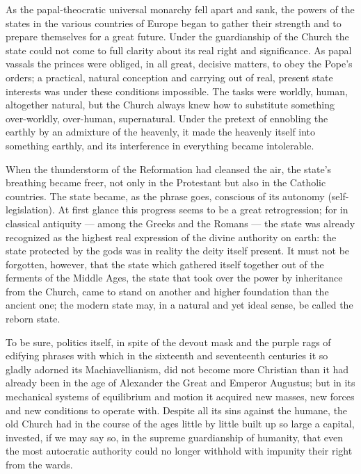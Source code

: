 \documentclass[12pt,a4paper,openany]{book}
\newcommand{\opage}[1]{\marginnote{\footnotesize\textit{[#1]}}}
\begin{document}
As the papal-theocratic universal monarchy
fell apart and sank, the powers of the states
in the various countries of Europe began to gather their strength and to prepare
themselves for a great future. Under the guardianship of the Church
the state could not come to full clarity about its real
right and significance. As papal vassals the princes were
obliged, in all great, decisive matters,
to obey the Pope's orders; a practical, natural conception
and carrying out of real, present state interests
was under these conditions impossible. The tasks were
worldly, human, altogether natural, but the Church
always knew how to substitute something over-worldly, over-human,
supernatural. Under the pretext of ennobling
\setcounter{footnote}{0}%
\opage{305}the earthly by an admixture of the heavenly, it
made the heavenly itself into something earthly, and its interference in
everything became intolerable.

When the thunderstorm of the Reformation had cleansed the air,
the state's breathing became freer, not only in the Protestant
but also in the Catholic countries. The state became, as
the phrase goes, conscious of its autonomy (self-legislation).
At first glance this progress seems to be a great
retrogression; for in classical antiquity --- among the Greeks
and the Romans --- the state was already recognized as the
highest real expression of the divine authority
on earth: the state protected by the gods was
in reality the deity itself present. It must not
be forgotten, however, that the state which gathered itself together out of the ferments of the Middle Ages, the state that took over
the power by inheritance from the Church, came to stand on another and higher foundation
than the ancient one; the modern state may, in a natural
and yet ideal sense, be called the reborn state.

To be sure, politics itself, in spite of the devout
mask and the purple rags of edifying phrases
with which in the sixteenth and seventeenth centuries it
so gladly adorned its Machiavellianism, did not
become more Christian than it had already been in the age of Alexander the
Great and Emperor Augustus; but in its mechanical systems of equilibrium and motion
it acquired new masses,
new forces and new conditions to operate with.
Despite all its sins against the humane, the old
Church had in the course of the ages little by little built up so large a
capital, invested, if we may say so, in the supreme guardianship of humanity,
that even the most autocratic
\setcounter{footnote}{0}%
\opage{306}authority could no longer withhold with impunity their
right from the wards.
\end{document}
